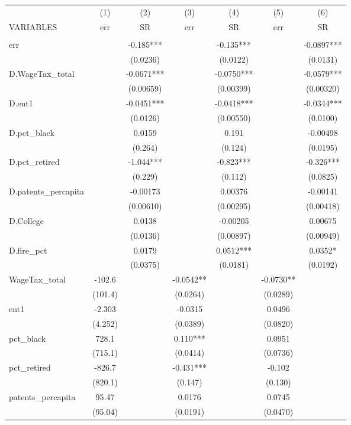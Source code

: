\begin{tabular}{lcccccc} \hline
 & (1) & (2) & (3) & (4) & (5) & (6) \\
VARIABLES & err & SR & err & SR & err & SR \\ \hline
 &  &  &  &  &  &  \\
err &  & -0.185*** &  & -0.135*** &  & -0.0897*** \\
 &  & (0.0236) &  & (0.0122) &  & (0.0131) \\
D.WageTax\_total &  & -0.0671*** &  & -0.0750*** &  & -0.0579*** \\
 &  & (0.00659) &  & (0.00399) &  & (0.00320) \\
D.ent1 &  & -0.0451*** &  & -0.0418*** &  & -0.0344*** \\
 &  & (0.0126) &  & (0.00550) &  & (0.0100) \\
D.pct\_black &  & 0.0159 &  & 0.191 &  & -0.00498 \\
 &  & (0.264) &  & (0.124) &  & (0.0195) \\
D.pct\_retired &  & -1.044*** &  & -0.823*** &  & -0.326*** \\
 &  & (0.229) &  & (0.112) &  & (0.0825) \\
D.patents\_percapita &  & -0.00173 &  & 0.00376 &  & -0.00141 \\
 &  & (0.00610) &  & (0.00295) &  & (0.00418) \\
D.College &  & 0.0138 &  & -0.00205 &  & 0.00675 \\
 &  & (0.0136) &  & (0.00897) &  & (0.00949) \\
D.fire\_pct &  & 0.0179 &  & 0.0512*** &  & 0.0352* \\
 &  & (0.0375) &  & (0.0181) &  & (0.0192) \\
WageTax\_total & -102.6 &  & -0.0542** &  & -0.0730** &  \\
 & (101.4) &  & (0.0264) &  & (0.0289) &  \\
ent1 & -2.303 &  & -0.0315 &  & 0.0496 &  \\
 & (4.252) &  & (0.0389) &  & (0.0820) &  \\
pct\_black & 728.1 &  & 0.110*** &  & 0.0951 &  \\
 & (715.1) &  & (0.0414) &  & (0.0736) &  \\
pct\_retired & -826.7 &  & -0.431*** &  & -0.102 &  \\
 & (820.1) &  & (0.147) &  & (0.130) &  \\
patents\_percapita & 95.47 &  & 0.0176 &  & 0.0745 &  \\
 & (95.04) &  & (0.0191) &  & (0.0470) &  \\

\end{tabular}
